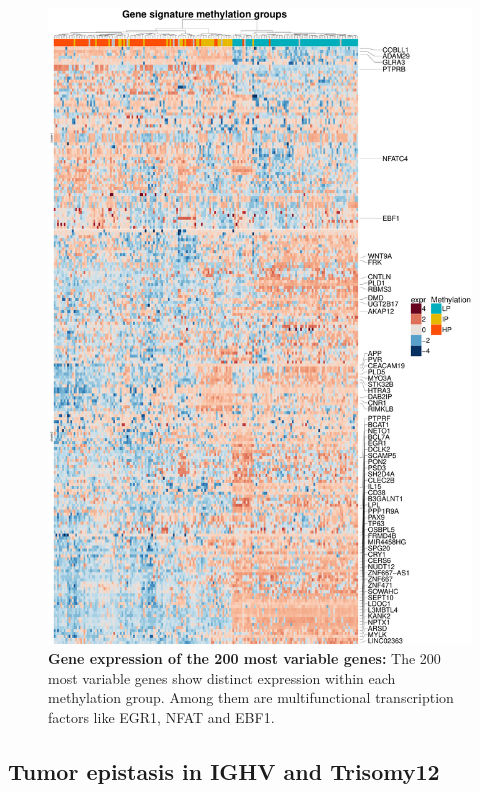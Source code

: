 \begin{figure}
	\centering
	\includegraphics[width=\columnwidth]{./Figures/gene_expr_Methylationgroups_top150.pdf}
	\caption{\textbf{Gene expression of the 200 most variable genes:} The 200 most variable genes show distinct expression within each methylation group. Among them are multifunctional transcription factors like EGR1, NFAT and EBF1.}
	\label{fig:gene_expr_Methylationgroups_top150}
\end{figure}

\FloatBarrier

\subsection{Tumor epistasis in IGHV and Trisomy12}

